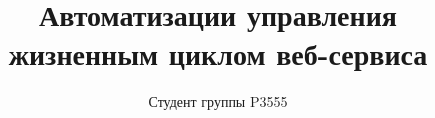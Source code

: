 \documentclass{../common/TechDoc}
\title{Автоматизации управления жизненным циклом веб-сервиса}
\author{Студент группы P3555}{С. А. Федюкович}
\begin{document}
    \maketitle

    \tableofcontents

    \newpage
    
    \newpage

    

    

    

    

    

    

    

    

    

    \registrationList
\end{document}

